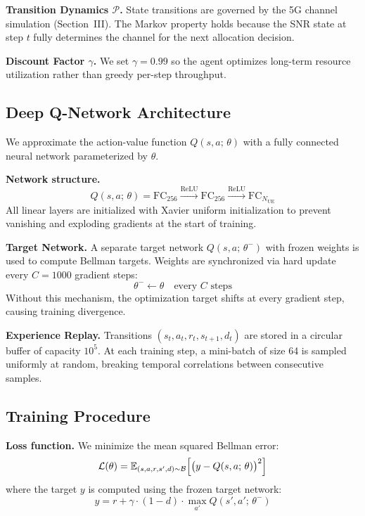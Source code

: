 \textbf{Transition Dynamics $\mathcal{P}$.}
State transitions are governed by the 5G channel simulation (Section~III).
The Markov property holds because the SNR state at step $t$ fully determines
the channel for the next allocation decision.

\textbf{Discount Factor $\gamma$.}
We set $\gamma = 0.99$ so the agent optimizes long-term resource utilization
rather than greedy per-step throughput.

\subsection{Deep Q-Network Architecture}

We approximate the action-value function $Q(s, a;\,\theta)$ with a fully
connected neural network parameterized by $\theta$.

\textbf{Network structure.}
\begin{equation}
    Q(s, a;\,\theta) =
        \text{FC}_{256} \xrightarrow{\text{ReLU}}
        \text{FC}_{256} \xrightarrow{\text{ReLU}}
        \text{FC}_{N_{\text{UE}}}
\end{equation}
All linear layers are initialized with Xavier uniform initialization to
prevent vanishing and exploding gradients at the start of training.

\textbf{Target Network.}
A separate target network $Q(s,a;\,\theta^{-})$ with frozen weights is used
to compute Bellman targets. Weights are synchronized via hard update every
$C = 1000$ gradient steps:
\begin{equation}
    \theta^{-} \leftarrow \theta \quad \text{every } C \text{ steps}
\end{equation}
Without this mechanism, the optimization target shifts at every gradient step,
causing training divergence.

\textbf{Experience Replay.}
Transitions $(s_t, a_t, r_t, s_{t+1}, d_t)$ are stored in a circular buffer of
capacity $10^5$. At each training step, a mini-batch of size 64 is sampled
uniformly at random, breaking temporal correlations between consecutive
samples.

\subsection{Training Procedure}

\textbf{Loss function.}
We minimize the mean squared Bellman error:
\begin{equation}
    \mathcal{L}(\theta) = \mathbb{E}_{(s,a,r,s',d)\sim\mathcal{B}}
        \Bigl[\bigl(y - Q(s, a;\,\theta)\bigr)^2\Bigr]
    \label{eq:loss}
\end{equation}
where the target $y$ is computed using the frozen target network:
\begin{equation}
    y = r + \gamma \cdot (1 - d) \cdot \max_{a'} Q(s', a';\,\theta^{-})
\end{equation}

